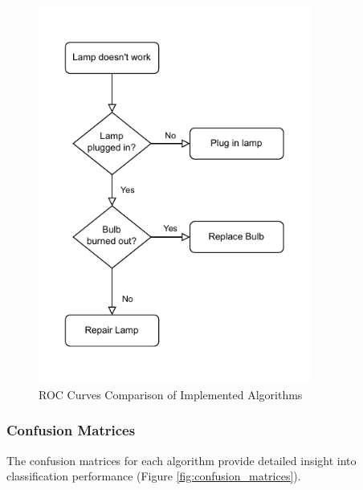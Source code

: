 \begin{figure}[h!]
\centering
\includegraphics[width=0.8\textwidth]{images/flow.pdf}
\caption{ROC Curves Comparison of Implemented Algorithms}
\label{fig:roc_curves}
\end{figure}

\subsubsection{Confusion Matrices}

The confusion matrices for each algorithm provide detailed insight into classification performance (Figure \ref{fig:confusion_matrices}).

